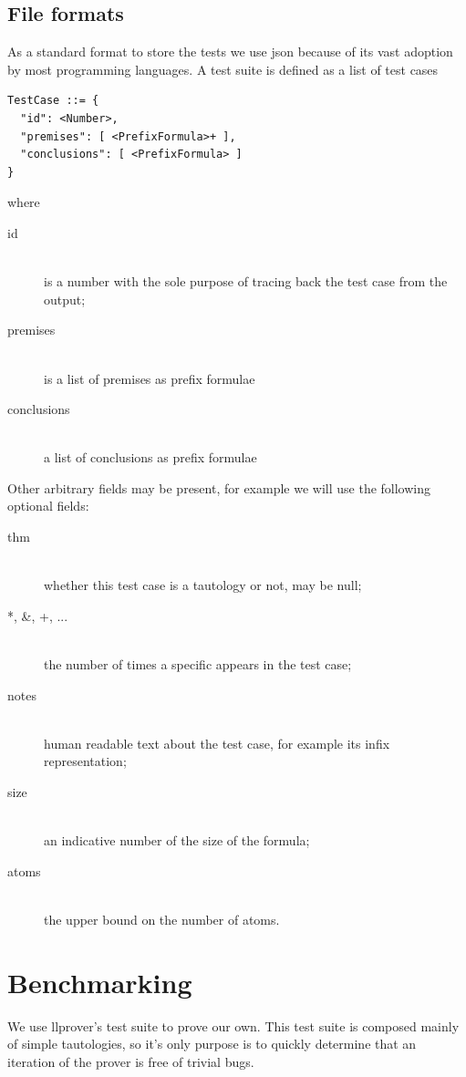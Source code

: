 \documentclass[a4paper, 12pt, tesi, english]{report}
\begin{document}

\subsection{File formats}
As a standard format to store the tests we use json because of its vast adoption by most programming languages.
A test suite is defined as a list of test cases
\begin{lstlisting}[numbers=none]
TestCase ::= {
  "id": <Number>,
  "premises": [ <PrefixFormula>+ ],
  "conclusions": [ <PrefixFormula> ]
}
\end{lstlisting}
where
\begin{description}
	\item[id] \hfill \\ is a number with the sole purpose of tracing back the test case from the output;
	\item[premises] \hfill \\ is a list of premises as prefix formulae
	\item[conclusions] \hfill \\ a list of conclusions as prefix formulae
\end{description}
Other arbitrary fields may be present, for example we will use the following optional fields:
\begin{description}
	\item[thm] \hfill \\ whether this test case is a tautology or not, may be null;
	\item[*, &, +, ...] \hfill \\ the number of times a specific appears in the test case;
	\item[notes] \hfill \\ human readable text about the test case, for example its infix representation;
	\item[size] \hfill \\ an indicative number of the size of the formula;
	\item[atoms] \hfill \\ the upper bound on the number of atoms.
\end{description}

\section{Benchmarking}
\label{sec:benchmarking}
We use llprover's test suite to prove our own.
This test suite is composed mainly of simple tautologies, so it's only purpose is to quickly determine that an iteration of the prover is free of trivial bugs.
\end{document}
